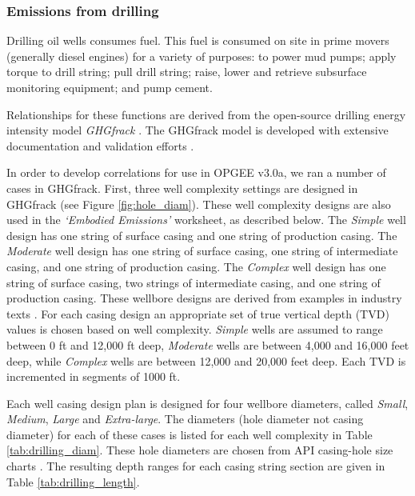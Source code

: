 \documentclass[11pt]{report}
\newcommand{\marg}[1]{{\footnotesize\textit{\textcolor{stanford}{'#1'}}}}
\newcommand{\marginnote}[1]{\marginpar{\marg{#1}}}
\newcommand{\version}{v3.0a}
\newcommand{\sheet}[1]{\textit{`{#1}'}}
\begin{document}
\subsubsection{Emissions from drilling}

Drilling oil wells consumes fuel. This fuel is consumed on site in prime movers (generally diesel engines) for a variety of purposes: to power mud pumps; apply torque to drill string; pull drill string; raise, lower and retrieve subsurface monitoring equipment; and pump cement. 

Relationships for these functions are derived from the open-source drilling energy intensity model \emph{GHGfrack} \cite{Vafi2016a, Vafi2016b, Vafi2016c}. The GHGfrack model is developed with extensive documentation and validation efforts \cite{Vafi2016a, Vafi2016b}.  

In order to develop correlations for use in OPGEE \version, we ran a number of cases in GHGfrack.  First, three well complexity settings are designed in GHGfrack (see Figure \ref{fig:hole_diam}).  These well complexity designs are also used in the \sheet{Embodied Emissions} worksheet, as described below.  \marginnote{Drilling \& Development 1.2}The \emph{Simple} well design has one string of surface casing and one string of production casing.  The \emph{Moderate} well design has one string of surface casing, one string of intermediate casing, and one string of production casing.  The \emph{Complex} well design has one string of surface casing, two strings of intermediate casing, and one string of production casing.  These wellbore designs are derived from examples in industry texts \cite{Mitchell2006}. For each casing design an appropriate set of true vertical depth (TVD) values is chosen based on well complexity. \emph{Simple} wells are assumed to range between 0 ft and 12,000 ft deep, \emph{Moderate} wells are between 4,000 and 16,000 feet deep, while \emph{Complex} wells are between 12,000 and 20,000 feet deep.  Each TVD is incremented in segments of 1000 ft.  

Each well casing design plan is designed for four wellbore diameters, called \emph{Small}, \emph{Medium}, \emph{Large} and \emph{Extra-large}.  The diameters (hole diameter not casing diameter) for each of these cases is listed for each well complexity in Table \ref{tab:drilling_diam}.  These hole diameters are chosen from API casing-hole size charts \cite[Figure 11.22]{Mitchell2006}.   The resulting depth ranges for each casing string section are given in Table \ref{tab:drilling_length}.  
\end{document}
